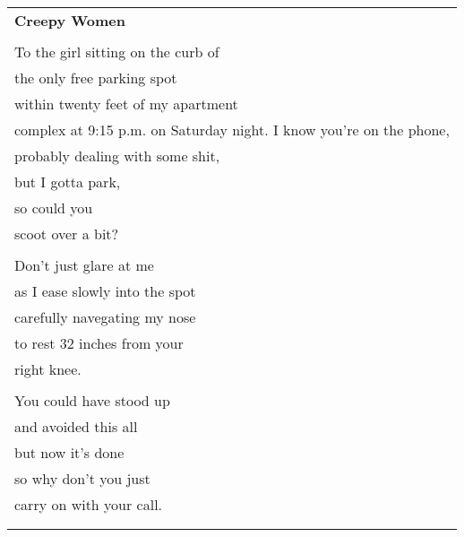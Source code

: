 \documentclass{article}
\begin{document}
\newcommand{\h}{\hspace{3ex}}
\newcommand{\hoar}{%
\begin{center}
\line(1,0){350}
\end{center}
}

\begin{center}
\begin{tabular}{l}
\textbf{Creepy Women} \\
\\
To the girl sitting on the curb of \\
the only free parking spot \\
within twenty feet of my apartment \\
complex at 9:15 p.m. on Saturday night. 
I know you're on the phone, \\
probably dealing with some shit, \\
but I gotta park, \\
so could you \\
scoot over a bit? \\
\\
Don't just glare at me \\
as I ease slowly into the spot \\
carefully navegating my nose \\
to rest 32 inches from your \\
right knee. \\
\\
You could have stood up \\
and avoided this all \\
but now it's done \\
so why don't you just \\
carry on with your call. \\
\\

\\


\end{tabular}
\end{center}
\end{document}
